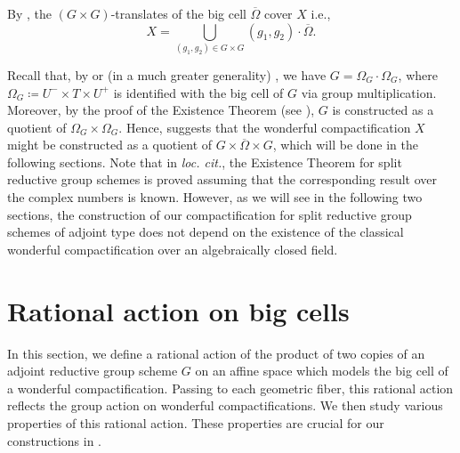 \documentclass[11pt, reqno]{amsart}
\theoremstyle{plain}
\theoremstyle{definition}
\begin{document}
By \cite[Theorem~6.1.8 (i)]{BrionKumar}, the $(G\times G)$-translates of the big cell $\overline{\Omega}$ cover $X$ i.e., 
\begin{equation}\label{translationbigcell}
    X=\bigcup_{(g_1, g_2)\in G\times G}(g_1, g_2)\cdot \overline{\Omega}.
\end{equation}

Recall that, by \cite[\S~5.1 Lemma~4]{BLR} or (in a much greater generality) \cite[exposé~VI$_A$, proposition~0.5]{SGA3I}, we have $G= \Omega_G \cdot\Omega_G$, where $\Omega_G\coloneq U^-\times T\times U^+$ is identified with the big cell of $G$ via group multiplication. Moreover, by the proof of the Existence Theorem (see \cite[exposé~XXV]{SGA3III}), $G$ is constructed as a quotient of $\Omega_G\times\Omega_G$. Hence,  suggests that the wonderful compactification $X$ might be constructed as a quotient of $G\times\overline{\Omega}\times G$, which will be done in the following sections. Note that in \emph{loc. cit.}, the Existence Theorem for split reductive group schemes is proved assuming that the corresponding result over the complex numbers is known. However, as we will see in the following two sections, the construction of our compactification for split reductive group schemes of adjoint type does not depend on the existence of the classical wonderful compactification over an algebraically closed field.















\section{Rational action on big cells}\label{sectionrationalact}
In this section, we define a rational action of the product of two copies of an adjoint reductive group scheme $G$ on an affine space which models the big cell of a wonderful compactification. Passing to each geometric fiber, this rational action reflects the group action on wonderful compactifications. We then study various properties of this rational action. These properties are crucial for our constructions in .
\end{document}
